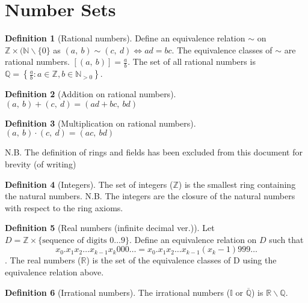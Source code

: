 \documentclass{article}
\theoremstyle{plain}
\numberwithin{theorem}{section}
\theoremstyle{definition}
\newtheorem{definition}{Definition}[section]
\numberwithin{definition}{section}
\newcommand*{\N}{\mathbb{N}}
\newcommand*{\Z}{\mathbb{Z}}
\newcommand*{\Q}{\mathbb{Q}}
\newcommand*{\I}{\mathbb{I}}
\newcommand*{\R}{\mathbb{R}}
\begin{document}
\section{Number Sets}
%
\begin{definition}[Rational numbers]
    Define an equivalence relation $\sim$ on $\Z \times (\N\backslash\{0\}$
    as $(a,\: b) \sim (c,\: d) \iff ad=bc$.
    The equivalence classes of $\sim$ are rational numbers.
    $[(a,\: b)] = \frac{a}{b}$.
    The set of all rational numbers is
    $\Q = \left\{ \frac{a}{b} : a\in \Z, b\in \N_{>0} \right\}$.
\end{definition}
%
\begin{definition}[Addition on rational numbers]
    $(a,\: b) + (c,\: d) = (ad+bc,\: bd)$
\end{definition}
%
\begin{definition}[Multiplication on rational numbers]
    $(a,\: b) \cdot (c,\: d) = (ac,\: bd)$
\end{definition}
%
N.B. The definition of rings and fields has been excluded from this document for brevity (of writing)
%
\begin{definition}[Integers]
    The set of integers ($\Z$) is the smallest ring containing the natural numbers.
    N.B. The integers are the closure of the natural numbers with respect to the ring axioms.
\end{definition}
%
\begin{definition}[Real numbers (infinite decimal ver.)]
    Let $D = \Z \times \{\text{sequence of digits $0\ldots 9$}\}$.
    Define an equivalence relation on $D$ such that
    \begin{equation*}
		x_0 . x_1 x_2 \dots x_{k-1} x_k 000 \ldots = x_0 . x_1 x_2 \dots x_{k-1} \left(x_k - 1\right)999 \ldots
	\end{equation*}.
    The real numbers ($\R$) is the set of the equivalence classes of D using the equivalence relation above.
\end{definition}
%
\begin{definition}[Irrational numbers]
    The irrational numbers ($\I$ or $\overline{\Q}$) is $\R\backslash\Q$.
\end{definition}
%
\end{document}

